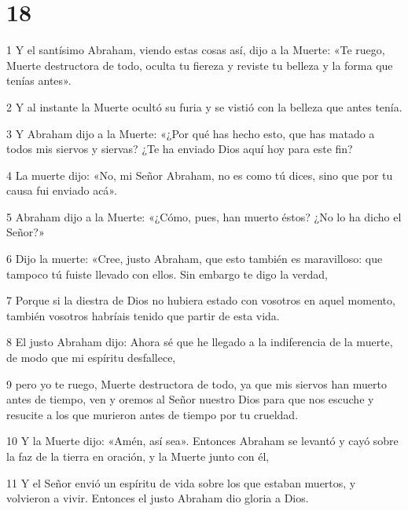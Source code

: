 \chapter{18}

\par 1 Y el santísimo Abraham, viendo estas cosas así, dijo a la Muerte: «Te ruego, Muerte destructora de todo, oculta tu fiereza y reviste tu belleza y la forma que tenías antes».

\par 2 Y al instante la Muerte ocultó su furia y se vistió con la belleza que antes tenía.

\par 3 Y Abraham dijo a la Muerte: «¿Por qué has hecho esto, que has matado a todos mis siervos y siervas? ¿Te ha enviado Dios aquí hoy para este fin?

\par 4 La muerte dijo: «No, mi Señor Abraham, no es como tú dices, sino que por tu causa fui enviado acá».

\par 5 Abraham dijo a la Muerte: «¿Cómo, pues, han muerto éstos? ¿No lo ha dicho el Señor?»

\par 6 Dijo la muerte: «Cree, justo Abraham, que esto también es maravilloso: que tampoco tú fuiste llevado con ellos. Sin embargo te digo la verdad,

\par 7 Porque si la diestra de Dios no hubiera estado con vosotros en aquel momento, también vosotros habríais tenido que partir de esta vida.

\par 8 El justo Abraham dijo: Ahora sé que he llegado a la indiferencia de la muerte, de modo que mi espíritu desfallece,

\par 9 pero yo te ruego, Muerte destructora de todo, ya que mis siervos han muerto antes de tiempo, ven y oremos al Señor nuestro Dios para que nos escuche y resucite a los que murieron antes de tiempo por tu crueldad.

\par 10 Y la Muerte dijo: «Amén, así sea». Entonces Abraham se levantó y cayó sobre la faz de la tierra en oración, y la Muerte junto con él,

\par 11 Y el Señor envió un espíritu de vida sobre los que estaban muertos, y volvieron a vivir. Entonces el justo Abraham dio gloria a Dios.

